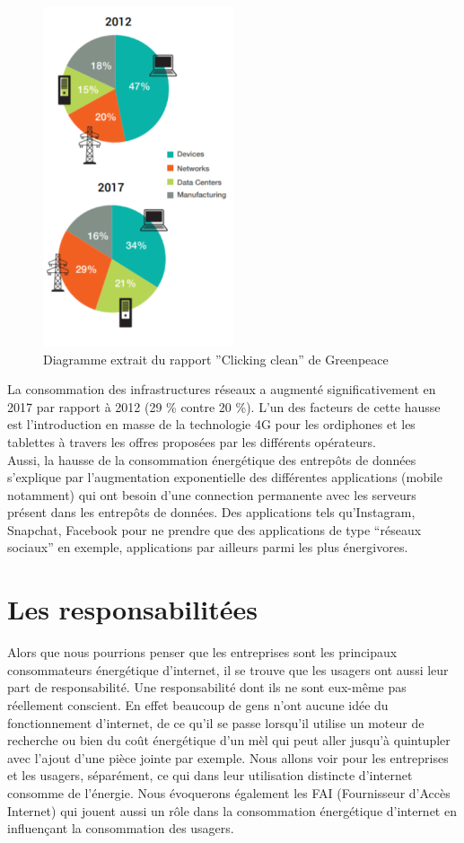 \documentclass[a4paper,twocolumn,12pt]{article}
\begin{document}
\begin{figure}[!h]	
\centerline{\includegraphics[height=10cm]{picture/diagCamenbert.png}}
\caption{Diagramme extrait du rapport ''Clicking clean'' de Greenpeace}
\label{diagCamenbert}
\end{figure}	

	La consommation des infrastructures réseaux a augmenté significativement  en 2017 par rapport à 2012 (29 \% contre 20 \%). L’un des facteurs de cette hausse est l’introduction en masse de la technologie 4G pour les ordiphones et les tablettes à travers les offres proposées par les différents opérateurs. \\

	Aussi, la hausse de la consommation énergétique des entrepôts de données s’explique par l’augmentation exponentielle des différentes applications (mobile notamment) qui ont besoin d’une connection permanente avec les serveurs présent dans les entrepôts de données. Des applications tels qu'Instagram, Snapchat, Facebook pour ne prendre que des applications de type “réseaux sociaux” en exemple, applications par ailleurs parmi les plus énergivores.
	
\section{Les responsabilitées}

	Alors que nous pourrions penser que les entreprises sont les principaux consommateurs énergétique d’internet, il se trouve que les usagers ont aussi leur part de responsabilité. Une responsabilité dont ils ne sont eux-même pas réellement conscient. En effet beaucoup de gens n’ont aucune idée du fonctionnement d’internet, de ce qu’il se passe lorsqu’il utilise un moteur de recherche ou bien du coût énergétique d’un mèl qui peut aller jusqu’à quintupler avec l’ajout d’une pièce jointe par exemple. Nous allons voir pour les entreprises et les usagers, séparément, ce qui dans leur utilisation distincte d’internet consomme de l’énergie. Nous évoquerons également les FAI (Fournisseur d'Accès Internet) qui jouent aussi un rôle dans la consommation énergétique d’internet en influençant la consommation des usagers.  
	
\end{document}

